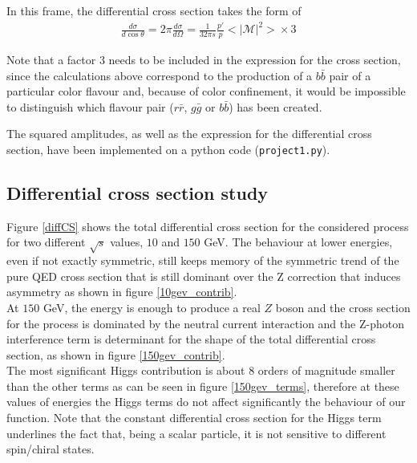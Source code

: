\documentclass[12pt,letterpaper]{article}
\newcommand{\avg}[1]{\big<#1\big>}
\begin{document}
In this frame, the differential cross section takes the form of
\begin{align*}
\frac{d\sigma}{d\cos\theta} = 2\pi \frac{d\sigma}{d\Omega} = \frac{1}{32\pi s}\frac{p'}{p}\avg{|\mathcal{M}|^2}\times 3
\end{align*}

Note that a factor 3 needs to be included in the expression for the cross section, since the calculations above correspond to the production of a $b\bar{b}$ pair of a particular color flavour and, because of color confinement, it would be impossible to distinguish which flavour pair ($r\bar{r}$, $g\bar{g}$ or $b\bar{b}$) has been created.

The squared amplitudes, as well as the expression for the differential cross section, have been implemented on a python code (\texttt{project1.py})\cite{github}.


\subsection{Differential cross section study}
Figure \ref{diffCS} shows the total differential cross section for the considered process for two different $\sqrt{s}$ values, $10$ and $150$ GeV. 
The behaviour at lower energies, even if not exactly symmetric, still keeps memory of the symmetric trend of the pure QED cross section that is still dominant over the Z correction that induces asymmetry as shown in figure \ref{10gev_contrib}. \\
At $150$ GeV, the energy is enough to produce a real $Z$ boson and the cross section for the process is dominated by the neutral current interaction and the Z-photon interference term is determinant for the shape of the total differential cross section, as shown in figure \ref{150gev_contrib}.\\
The most significant Higgs contribution is about 8 orders of magnitude smaller than the other terms as can be seen in figure \ref{150gev_terms}, therefore at these values of energies the Higgs terms do not affect significantly the behaviour of our function. Note that the constant differential cross section for the Higgs term underlines the fact that, being a scalar particle, it is not sensitive to different spin/chiral states.
\end{document}
